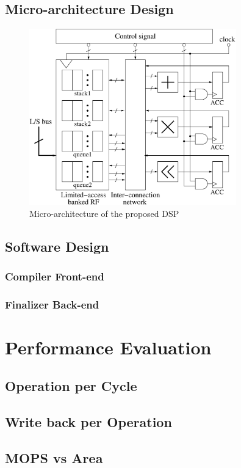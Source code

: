 \documentclass[12pt]{article}
\begin{document}
\begin{CJK}{UTF8}{bkai}
    \subsection{Micro-architecture Design}
        \begin{figure}[!ht]
            \caption{Micro-architecture of the proposed DSP}
            \centering
            \includegraphics[width=0.8\textwidth]{./figs/micro.eps}
        \end{figure}
    \subsection{Software Design}
        \subsubsection{Compiler Front-end}
        \subsubsection{Finalizer Back-end}

\section{Performance Evaluation}
    \subsection{Operation per Cycle}
    \subsection{Write back per Operation}
    \subsection{MOPS vs Area}

\end{CJK}
\end{document}

